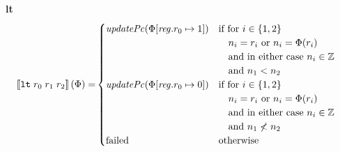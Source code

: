 \documentclass[a3paper]{article}
\newcommand{\sem}[1]{\left\llbracket #1 \right\rrbracket}
\newcommand{\targetcolor}[1]{\color{black}}
\newcommand{\trg}[1]{{\targetcolor{} #1}}
\newcommand{\zinstr}[1]{\texttt{#1}}
\newcommand{\threeinstr}[4]{
  \ifthenelse{\equal{#2#3#4}{}}
  {\zinstr{#1}}
  {\zinstr{#1} \; #2 \; #3 \; #4}
}
\newcommand{\tlt}[3]{\threeinstr{\trg{lt}}{#1}{#2}{#3}}
\newcommand{\ints}{\mathbb{Z}}
\newcommand{\update}[2]{[#1 \mapsto #2]}
\newcommand{\updReg}[2]{\update{\reg.#1}{#2}}
\newcommand{\failed}{\mathrm{failed}}
\newcommand{\var}[1]{\mathit{#1}}
\newcommand{\reg}{\var{reg}}
\newcommand{\plainfun}[2]{
  \ifthenelse{\equal{#2}{}}
  {\mathit{#1}}
  {\mathit{#1}(#2)}
}
\newcommand{\updPcAddr}[1]{\plainfun{updatePc}{#1}}
\begin{document}
\noindent\textbf{lt}\\
\begin{align*}
  \sem{\tlt{r_0}{r_1}{r_2}}(\Phi) = &
                                                  \begin{cases}
                                                    \updPcAddr{\Phi\updReg{r_0}{1}} &
                                                    \arraycolsep=0pt
                                                    \begin{array}[t]{l}
                                                      \text{if for $i \in \{1,2\}$}\\
                                                      \quad\text{$n_i = r_i$ or $n_i = \Phi(r_i)$}\\
                                                      \quad\text{and in either case $n_i \in \ints$}\\
                                                      \quad\text{and $n_1 < n_2$}\\        
                                                    \end{array}\\
                                                    \updPcAddr{\Phi\updReg{r_0}{0}} &
                                                    \arraycolsep=0pt
                                                    \begin{array}[t]{l}
                                                      \text{if for $i \in \{1,2\}$}\\
                                                      \quad\text{$n_i = r_i$ or $n_i = \Phi(r_i)$}\\
                                                      \quad\text{and in either case $n_i \in \ints$}\\
                                                      \quad\text{and $n_1 \not< n_2$}\\        
                                                    \end{array}\\
                                                    \failed & \text{otherwise}
                                                  \end{cases}  
\end{align*}
\end{document}
